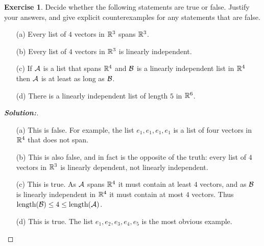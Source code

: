 \documentclass[a4paper]{amsart}
\theoremstyle{definition}
\newtheorem{exercise}{Exercise}
\newenvironment{solution}{\begin{proof}[\textbf{Solution:}] \vphantom{u}}{\end{proof}}
\begin{document}
\begin{exercise}\label{ex-independent-iv}
 Decide whether the following statements are true or false.  Justify
 your answers, and give explicit counterexamples for any statements
 that are false.
 \begin{itemize}
  \item[(a)] Every list of $4$ vectors in ${\mathbb{R}}^3$ spans ${\mathbb{R}}^3$.
  \item[(b)] Every list of $4$ vectors in ${\mathbb{R}}^3$ is linearly
   independent.
  \item[(c)] If $\mathcal{A}$ is a list that spans ${\mathbb{R}}^4$ and $\mathcal{B}$ is a
   linearly independent list in ${\mathbb{R}}^4$ then $\mathcal{A}$ is at least as long
   as $\mathcal{B}$.
  \item[(d)] There is a linearly independent list of length $5$ in
   ${\mathbb{R}}^6$. 
 \end{itemize}
\end{exercise}
\begin{solution}
 \begin{itemize}
  \item[(a)] This is false.  For example, the list $e_1,e_1,e_1,e_1$
   is a list of four vectors in ${\mathbb{R}}^4$ that does not span.
  \item[(b)] This is also false, and in fact is the opposite of the
   truth: every list of $4$ vectors in ${\mathbb{R}}^3$ is linearly dependent,
   not linearly independent.
  \item[(c)] This is true.  As $\mathcal{A}$ spans ${\mathbb{R}}^4$ it must contain at
   least $4$ vectors, and as $\mathcal{B}$ is linearly independent in ${\mathbb{R}}^4$
   it must contain at most $4$ vectors. 
   Thus $\text{length}(\mathcal{B})\leq 4\leq\text{length}(\mathcal{A})$.
  \item[(d)] This is true.  The list $e_1,e_2,e_3,e_4,e_5$ is the most
   obvious example.
 \end{itemize}
\end{solution}
\end{document}
